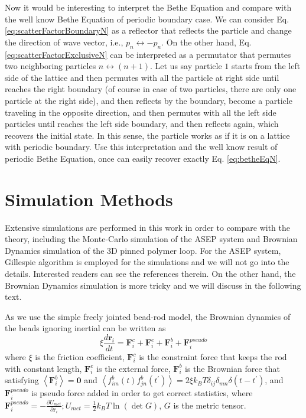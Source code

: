 \documentclass[aps,showpacs,twocolumn,floatfix,prx,superscriptaddress]{revtex4-1}
\begin{document}
Now it would be interesting to interpret the Bethe Equation and compare with the well know Bethe Equation of periodic boundary case. We can consider Eq.  \eqref{eq:scatterFactorBoundaryN} as a reflector that reflects the particle and change the direction of wave vector, i.e., $p_n\leftrightarrow-p_n$.  On the other hand, Eq. \eqref{eq:scatterFactorExclusiveN} can be interpreted as a permutator that permutes two neighboring particles $n\leftrightarrow (n+1)$.  Let us say particle $1$ starts from the left side of the lattice and then permutes with all the particle at right side until reaches the right boundary (of course in case of two particles, there are only one particle at the right side), and then reflects by the boundary, become a particle traveling in the opposite direction, and then permutes with all the left side particles until reaches the left side boundary, and then reflects again, which recovers the initial state.  In this sense, the particle works as if it is on a lattice with periodic boundary. Use this interpretation and the well know result of periodic Bethe Equation, once can easily recover exactly Eq. \eqref{eq:betheEqN}. 


\section{Simulation Methods}
\label{sec:simulation_methods}

Extensive simulations are performed in this work in order to compare with the theory, including the Monte-Carlo simulation of the ASEP system and Brownian Dynamics simulation of the 3D pinned polymer loop. For the ASEP system, Gillespie algorithm \cite{} is employed for the simulations and we will not go into the details. Interested readers can see the references therein. On the other hand, the Brownian Dynamics simulation is more tricky and we will discuss in the following text.

As we use the simple freely jointed bead-rod model, the Brownian dynamics of the beads ignoring inertial can be written as
\begin{equation}
    \label{eq:beadDynamics}
    \xi \frac{d \mathbf{r}_i}{d t} = \mathbf{F}_i^{c} + \mathbf{F}_i^{e} + \mathbf{F}_i^{b} + \mathbf{F}_i^{pseudo}
\end{equation}
where $\xi$ is the friction coefficient, $\mathbf{F}_i^{c}$ is the constraint force that keeps the rod with constant length, $\mathbf{F}_i^e$ is the external force, $\mathbf{F}_i^{b}$ is the Brownian force that satisfying $\left<\mathbf{F}_i^{b}\right> = \mathbf{0}$ and $\left<f_{im}^b(t)f_{jn}^b(t^\prime)\right> = 2\xi k_B T \delta_{ij} \delta_{m n}\delta(t-t^\prime)$, and $\mathbf{F}_i^{pseudo}$ is pseudo force added in order to get correct statistics, where $\mathbf{F}_i^{pseudo} = -\frac{\partial U_{met}}{\partial\mathbf{r}_i}; U_{met} = \frac{1}{2}k_B T \ln(\det G)$, $G$ is the metric tensor\cite{}.
\end{document}
